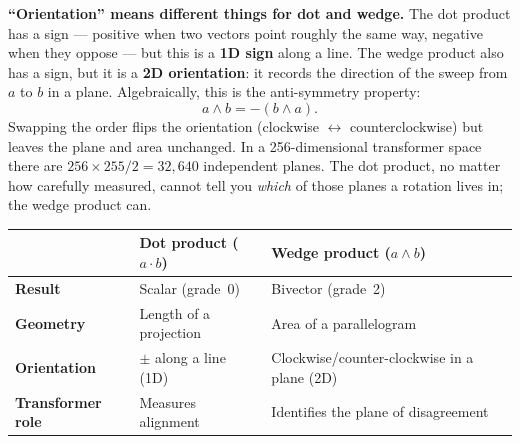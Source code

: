 \documentclass[11pt, twoside, openright]{memoir}
\newcommand{\ip}{\cdot}           %
\newcommand{\op}{\wedge}          %
\numberwithin{equation}{chapter}
\begin{document}
\begin{pitfall}
\textbf{``Orientation'' means different things for dot and wedge.}
The dot product has a sign --- positive when two vectors point roughly
the same way, negative when they oppose --- but this is a \textbf{1D
sign} along a line.  The wedge product also has a sign, but it is a
\textbf{2D orientation}: it records the direction of the sweep from
$a$ to $b$ in a plane.  Algebraically, this is the anti-symmetry
property:
\[
  a \op b = -(b \op a).
\]
Swapping the order flips the orientation (clockwise $\leftrightarrow$
counterclockwise) but leaves the plane and area unchanged.  In a
256-dimensional transformer space there are $256 \times 255 / 2 =
32{,}640$ independent planes.  The dot product, no matter how
carefully measured, cannot tell you \emph{which} of those planes a
rotation lives in; the wedge product can.

\medskip
\renewcommand{\arraystretch}{1.3}\small
\begin{tabular}{@{}lll@{}}
\toprule
 & \textbf{Dot product} ($a \ip b$) & \textbf{Wedge product} ($a \op b$) \\
\midrule
\textbf{Result} & Scalar (grade~0) & Bivector (grade~2) \\
\textbf{Geometry} & Length of a projection & Area of a parallelogram \\
\textbf{Orientation} & $\pm$ along a line (1D) & Clockwise/counter-clockwise in a plane (2D) \\
\textbf{Transformer role} & Measures alignment & Identifies the plane of disagreement \\
\bottomrule
\end{tabular}
\end{pitfall}
\end{document}
